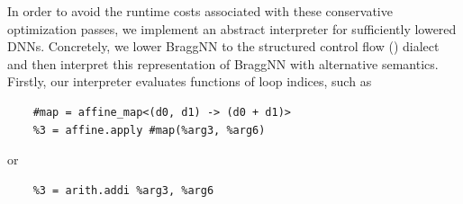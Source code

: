 In order to avoid the runtime costs associated with these conservative optimization passes, we implement an abstract interpreter for sufficiently lowered DNNs.
Concretely, we lower BraggNN to the structured control flow () dialect and then interpret this representation of BraggNN with alternative semantics.
Firstly, our interpreter evaluates functions of loop indices, such as 
\begin{verbatim}
	#map = affine_map<(d0, d1) -> (d0 + d1)>
	%3 = affine.apply #map(%arg3, %arg6)
\end{verbatim}
or 
\begin{verbatim}
	%3 = arith.addi %arg3, %arg6
\end{verbatim}
